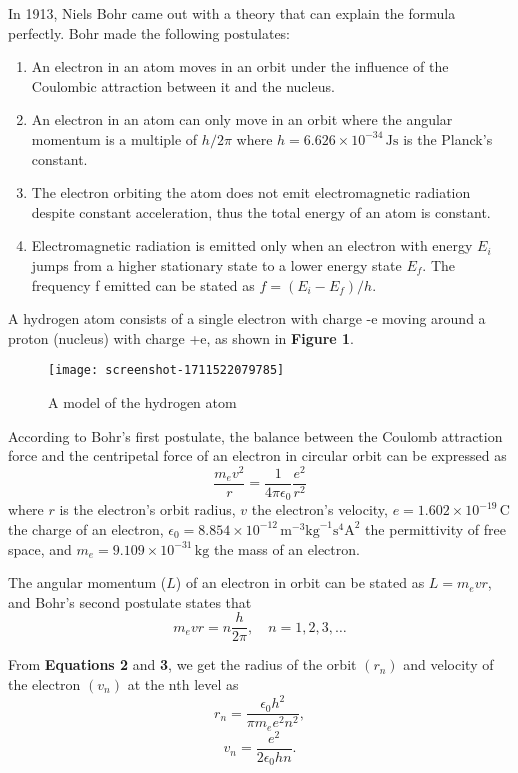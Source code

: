 \documentclass[a4paper,11pt]{article}
\begin{document}
In 1913, Niels Bohr came out with a theory that can explain the formula perfectly. Bohr made the following postulates:
\begin{enumerate}
    \item An electron in an atom moves in an orbit under the influence of the Coulombic attraction between it and the nucleus.
    \item An electron in an atom can only move in an orbit where the angular momentum is a multiple of $h/2\pi$ where $h = 6.626 \times 10^{-34} \, \text{Js}$ is the Planck's constant.
    \item The electron orbiting the atom does not emit electromagnetic radiation despite constant acceleration, thus the total energy of an atom is constant.
    \item Electromagnetic radiation is emitted only when an electron with energy $E_i$ jumps from a higher stationary state to a lower energy state $E_f$. The frequency f emitted can be stated as $f = (E_i - E_f)/h$.
\end{enumerate}
A hydrogen atom consists of a single electron with charge -e moving around a proton (nucleus) with charge +e, as shown in \textbf{Figure 1}.\\
\begin{figure}[h!]
\centering
\texttt{[image: screenshot-1711522079785]}
\caption{A model of the hydrogen atom}
\label{fig:your_label}
\end{figure}

According to Bohr’s first postulate, the balance between the Coulomb attraction force and the centripetal force of an electron in circular orbit can be expressed as
\begin{equation}
\frac{m_e v^2}{r} = \frac{1}{4 \pi \epsilon_0} \frac{e^2}{r^2}
\end{equation}
where $r$ is the electron’s orbit radius, $v$ the electron’s velocity, $e = 1.602 \times 10^{-19} \, \text{C}$ the charge of an electron, $\epsilon_0 = 8.854 \times 10^{-12} \, \text{m}^{-3}\text{kg}^{-1}\text{s}^{4}\text{A}^{2}$ the permittivity of free space, and $m_e = 9.109 \times 10^{-31} \, \text{kg}$ the mass of an electron.

The angular momentum ($L$) of an electron in orbit can be stated as $L = m_e v r$, and Bohr's second postulate states that
\begin{equation}
m_e v r = n\frac{h}{2\pi}, \quad n = 1, 2, 3, \ldots
\end{equation}

From \textbf{Equations 2} and \textbf{3}, we get the radius of the orbit $(r_n)$ and velocity of the electron $(v_n)$ at the nth level as
\begin{equation}
r_n = \frac{\epsilon_0 h^2}{\pi m_e e^2 n^2},
\end{equation}
\begin{equation}
v_n = \frac{e^2}{2 \epsilon_0 h n}.
\end{equation}
\end{document}
